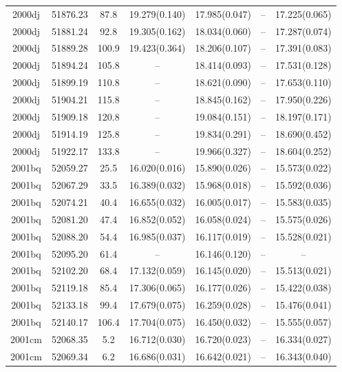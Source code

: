 \begin{table*}
\begin{tabular}{ccccccc}
2000dj	  & 51876.23	 & 87.8	& 19.279(0.140)	 & 17.985(0.047)	 & --	 & 17.225(0.065) \\ 
2000dj	  & 51881.24	 & 92.8	& 19.305(0.162)	 & 18.034(0.060)	 & --	 & 17.287(0.074) \\ 
2000dj	  & 51889.28	 & 100.9	& 19.423(0.364)	 & 18.206(0.107)	 & --	 & 17.391(0.083) \\ 
2000dj	  & 51894.24	 & 105.8	& --	 & 18.414(0.093)	 & --	 & 17.531(0.128) \\ 
2000dj	  & 51899.19	 & 110.8	& --	 & 18.621(0.090)	 & --	 & 17.653(0.110) \\ 
2000dj	  & 51904.21	 & 115.8	& --	 & 18.845(0.162)	 & --	 & 17.950(0.226) \\ 
2000dj	  & 51909.18	 & 120.8	& --	 & 19.084(0.151)	 & --	 & 18.197(0.171) \\ 
2000dj	  & 51914.19	 & 125.8	& --	 & 19.834(0.291)	 & --	 & 18.690(0.452) \\ 
2000dj	  & 51922.17	 & 133.8	& --	 & 19.966(0.327)	 & --	 & 18.604(0.252) \\ 
2001bq	  & 52059.27	 & 25.5	& 16.020(0.016)	 & 15.890(0.026)	 & --	 & 15.573(0.022) \\ 
2001bq	  & 52067.29	 & 33.5	& 16.389(0.032)	 & 15.968(0.018)	 & --	 & 15.592(0.036) \\ 
2001bq	  & 52074.21	 & 40.4	& 16.655(0.032)	 & 16.005(0.017)	 & --	 & 15.583(0.035) \\ 
2001bq	  & 52081.20	 & 47.4	& 16.852(0.052)	 & 16.058(0.024)	 & --	 & 15.575(0.026) \\ 
2001bq	  & 52088.20	 & 54.4	& 16.985(0.037)	 & 16.117(0.019)	 & --	 & 15.528(0.021) \\ 
2001bq	  & 52095.20	 & 61.4	& --	 & 16.146(0.120)	 & --	 & -- \\ 
2001bq	  & 52102.20	 & 68.4	& 17.132(0.059)	 & 16.145(0.020)	 & --	 & 15.513(0.021) \\ 
2001bq	  & 52119.18	 & 85.4	& 17.306(0.065)	 & 16.177(0.026)	 & --	 & 15.422(0.038) \\ 
2001bq	  & 52133.18	 & 99.4	& 17.679(0.075)	 & 16.259(0.028)	 & --	 & 15.476(0.041) \\ 
2001bq	  & 52140.17	 & 106.4	& 17.704(0.075)	 & 16.450(0.032)	 & --	 & 15.555(0.057) \\ 
2001cm	  & 52068.35	 & 5.2	& 16.712(0.030)	 & 16.720(0.023)	 & --	 & 16.334(0.027) \\ 
2001cm	  & 52069.34	 & 6.2	& 16.686(0.031)	 & 16.642(0.021)	 & --	 & 16.343(0.040) \\ 

\end{tabular}
\end{table*}
